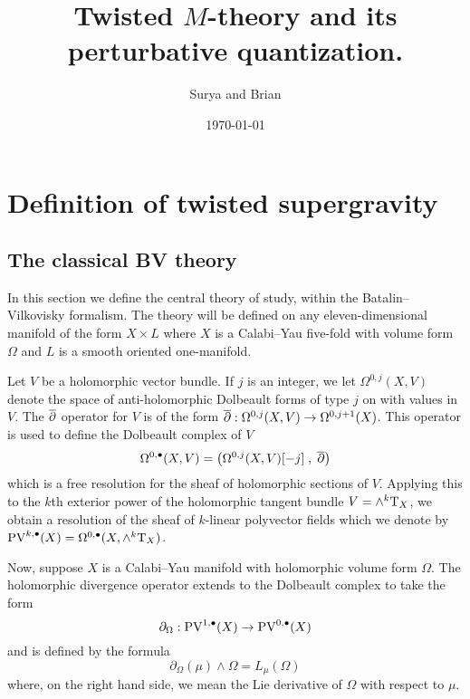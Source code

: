 \documentclass[11pt]{amsart}
\author{Surya and Brian}
\date{\today}
\title{Twisted \(M\)-theory and its perturbative quantization.}
\def\PV{{\rm PV}}
\def\T{{\rm T}}
\begin{document}
\maketitle
\tableofcontents


\section{Definition of twisted supergravity}

\label{sec:org24653eb}
\subsection{The classical BV theory}
\label{sec:org5c9d94b}
In this section we define the central theory of study, within the Batalin--Vilkovisky formalism.
The theory will be defined on any eleven-dimensional manifold of the form $X \times L$ where $X$ is a Calabi--Yau five-fold with volume form $\Omega$ and $L$ is a smooth oriented one-manifold.

Let $V$ be a holomorphic vector bundle. 
If $j$ is an integer, we let $\Omega^{0,j}(X, V)$ denote the space of anti-holomorphic Dolbeault forms of type $j$ on with values in $V$.
The $\overline{\partial}$ operator for $V$ is of the form $\overline{\partial} : \Omega^{0,j}(X, V)\to \Omega^{0,j+1}(X)$.
This operator is used to define the Dolbeault complex of $V$
\[
  \Omega^{0,\bullet}(X, V) = \left(\Omega^{0,j}(X, V)[-j] \; , \; \overline{\partial}\right)
\]
which is a free resolution for the sheaf of holomorphic sections of $V$.
Applying this to the $k$th exterior power of the holomorphic tangent bundle $V = \wedge^k \T_X$, we obtain a resolution of the sheaf of $k$-linear polyvector fields which we denote by $\PV^{k,\bu} (X) = \Omega^{0,\bu}(X, \wedge^k \T_X)$. 

Now, suppose $X$ is a Calabi--Yau manifold with holomorphic volume form $\Omega$.
The holomorphic divergence operator extends to the Dolbeault complex to take the form
\[
  \partial_\Omega : \PV^{1,\bu}(X) \to \PV^{0,\bu}(X)
\]
and is defined by the formula
\[
  \partial_\Omega (\mu) \wedge \Omega = L_\mu (\Omega)
\]
where, on the right hand side, we mean the Lie derivative of $\Omega$ with respect to $\mu$.
\end{document}
